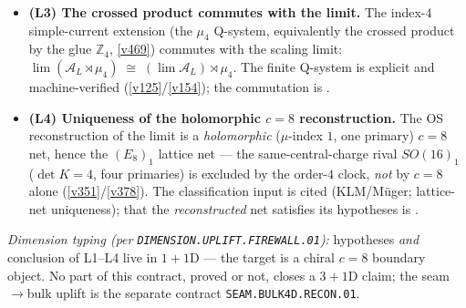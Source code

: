\documentclass[11pt,a4paper]{article}
\newcommand{\Z}{\mathbb Z}
\begin{document}
\begin{itemize}
  executed at the finite level (measured $c=8.005$, $(E_8)_1$ vacuum character
  $[1,0,248,0,4124,0,34752]$, $k=1$, $\det D_8=4\to\det E_8=1$); C6 is the written-out
  quasi-free theorem, C7 stays cited.
\item \textbf{(L3) The crossed product commutes with the limit.} The index-$4$ simple-current
  extension (the $\mu_4$ Q-system, equivalently the crossed product by the glue
  $\Z_4$, \vref{v469}) commutes with the scaling limit:
  $\lim(\mathcal A_L\rtimes\mu_4)\;\cong\;(\lim\mathcal A_L)\rtimes\mu_4$. The finite Q-system
  is explicit and machine-verified (\vref{v125}/\vref{v154}); the commutation is \mO.
\item \textbf{(L4) Uniqueness of the holomorphic $c=8$ reconstruction.} The OS reconstruction of
  the limit is a \emph{holomorphic} ($\mu$-index $1$, one primary) $c=8$ net, hence the
  $(E_8)_1$ lattice net --- the same-central-charge rival $SO(16)_1$ ($\det K=4$, four
  primaries) is excluded by the order-$4$ clock, \emph{not} by $c=8$ alone
  (\vref{v351}/\vref{v378}). The classification input is cited (KLM/M\"uger; lattice-net
  uniqueness); that the \emph{reconstructed} net satisfies its hypotheses is \mO.
\end{itemize}
\emph{Dimension typing (per \texttt{DIMENSION.UPLIFT.FIREWALL.01}):} hypotheses \emph{and}
conclusion of L1--L4 live in $1{+}1$D --- the target is a chiral $c{=}8$ boundary object.  No
part of this contract, proved or not, closes a $3{+}1$D claim; the seam$\to$bulk uplift is the
separate contract \texttt{SEAM.BULK4D.RECON.01}.
\end{document}
